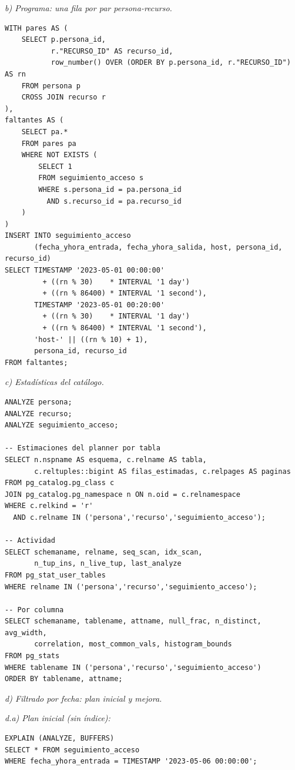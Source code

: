 \documentclass[11pt,a4paper]{article}
\begin{document}
\textit{b) Programa: una fila por par persona-recurso.}

\begin{lstlisting}
WITH pares AS (
    SELECT p.persona_id,
           r."RECURSO_ID" AS recurso_id,
           row_number() OVER (ORDER BY p.persona_id, r."RECURSO_ID") AS rn
    FROM persona p
    CROSS JOIN recurso r
),
faltantes AS (
    SELECT pa.*
    FROM pares pa
    WHERE NOT EXISTS (
        SELECT 1
        FROM seguimiento_acceso s
        WHERE s.persona_id = pa.persona_id
          AND s.recurso_id = pa.recurso_id
    )
)
INSERT INTO seguimiento_acceso
       (fecha_yhora_entrada, fecha_yhora_salida, host, persona_id, recurso_id)
SELECT TIMESTAMP '2023-05-01 00:00:00'
         + ((rn % 30)    * INTERVAL '1 day')
         + ((rn % 86400) * INTERVAL '1 second'),
       TIMESTAMP '2023-05-01 00:20:00'
         + ((rn % 30)    * INTERVAL '1 day')
         + ((rn % 86400) * INTERVAL '1 second'),
       'host-' || ((rn % 10) + 1),
       persona_id, recurso_id
FROM faltantes;
\end{lstlisting}

\textit{c) Estadísticas del catálogo.}

\begin{lstlisting}
ANALYZE persona;
ANALYZE recurso;
ANALYZE seguimiento_acceso;

-- Estimaciones del planner por tabla
SELECT n.nspname AS esquema, c.relname AS tabla,
       c.reltuples::bigint AS filas_estimadas, c.relpages AS paginas
FROM pg_catalog.pg_class c
JOIN pg_catalog.pg_namespace n ON n.oid = c.relnamespace
WHERE c.relkind = 'r'
  AND c.relname IN ('persona','recurso','seguimiento_acceso');

-- Actividad
SELECT schemaname, relname, seq_scan, idx_scan,
       n_tup_ins, n_live_tup, last_analyze
FROM pg_stat_user_tables
WHERE relname IN ('persona','recurso','seguimiento_acceso');

-- Por columna
SELECT schemaname, tablename, attname, null_frac, n_distinct, avg_width,
       correlation, most_common_vals, histogram_bounds
FROM pg_stats
WHERE tablename IN ('persona','recurso','seguimiento_acceso')
ORDER BY tablename, attname;
\end{lstlisting}

\textit{d) Filtrado por fecha: plan inicial y mejora.}

\textit{d.a) Plan inicial (sin índice):}

\begin{lstlisting}
EXPLAIN (ANALYZE, BUFFERS)
SELECT * FROM seguimiento_acceso
WHERE fecha_yhora_entrada = TIMESTAMP '2023-05-06 00:00:00';
\end{lstlisting}
\end{document}
